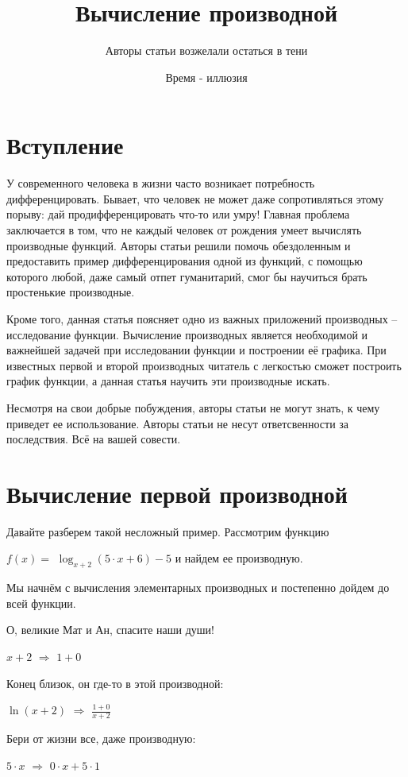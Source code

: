 \documentclass{article}
\title{Вычисление производной}
\author{Авторы статьи возжелали остаться в тени}
\date{Время - иллюзия}
\begin{document}
\maketitle

\section{Вступление}

У современного человека в жизни часто возникает потребность дифференцировать. Бывает, что человек не может даже сопротивляться этому порыву: дай продифференцировать что-то или умру! Главная проблема заключается в том, что не каждый человек от рождения умеет вычислять производные функций. Авторы статьи решили помочь обездоленным и предоставить пример дифференцирования одной из функций, с помощью которого любой, даже самый отпет гуманитарий, смог бы научиться брать простенькие производные.

Кроме того, данная статья поясняет одно из важных приложений производных -- исследование функции. Вычисление производных является необходимой и важнейшей задачей при исследовании функции и построении её графика. При известных первой и второй производных читатель с легкостью сможет построить график функции, а данная статья научить эти производные искать.

Несмотря на свои добрые побуждения, авторы статьи не могут знать, к чему приведет ее использование. Авторы статьи не несут ответсвенности за последствия. Всё на вашей совести.

\section{Вычисление первой производной}

Давайте разберем такой несложный пример. Рассмотрим функцию 

$f(x) = $ $\log_{x + 2}(5 \cdot x + 6) - 5$ и найдем ее производную.

Мы начнём с вычисления элементарных производных и постепенно дойдем до всей функции.

О, великие Мат и Ан, спасите наши души!

$x + 2$ $\Rightarrow$ $1 + 0$

Конец близок, он где-то в этой производной:

$ \ln (x + 2)$ $\Rightarrow$ $\frac{1 + 0}{x + 2}$

Бери от жизни все, даже производную:

$5 \cdot x$ $\Rightarrow$ $0 \cdot x + 5 \cdot 1$
\end{document}
